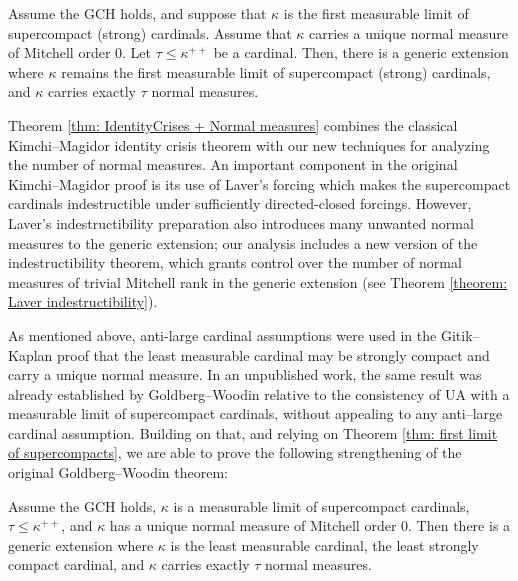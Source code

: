 \documentclass[11pt]{amsart}
\newenvironment{manualtheorem}[1]{%
  \IfBlankTF{#1}
    {\renewcommand{\themanualtheoreminner}{\unskip}}
    {\renewcommand\themanualtheoreminner{#1}}%
  \manualtheoreminner
}{\endmanualtheoreminner}
\theoremstyle{definition}
\theoremstyle{remark}
\newcommand\<{{<}}
\begin{document}
\begin{manualtheorem}{\ref{thm: first limit of supercompacts}}
  Assume the $\mathrm{GCH}$ holds, and  suppose that $\kappa$ is the first measurable limit of supercompact (strong) cardinals. Assume that $\kappa$ carries a unique normal measure of Mitchell order 0. Let $\tau\leq \kappa^{++}$ be a cardinal. Then, there is  a generic extension where $\kappa$ remains the first measurable limit of supercompact (strong) cardinals, and $\kappa$ carries exactly $\tau$ normal measures. 
\end{manualtheorem}




Theorem \ref{thm: IdentityCrises + Normal measures} combines the classical Kimchi--Magidor identity crisis theorem with our new techniques for analyzing the number of normal measures. An important component in the original Kimchi--Magidor proof is its use of Laver's forcing which makes the supercompact cardinals indestructible under sufficiently directed-closed forcings. However, Laver's indestructibility preparation also introduces many unwanted normal measures to the generic extension; our analysis includes a new version of the indestructibility theorem, which grants control over the number of normal measures of trivial Mitchell rank in the generic extension (see Theorem \ref{theorem: Laver indestructibility}). 

As mentioned above, anti-large cardinal assumptions were used in the Gitik--Kaplan proof that the least measurable cardinal may be strongly compact and carry a unique normal measure. In an unpublished work, the same result was already established by Goldberg--Woodin relative to the consistency of UA with a measurable limit of supercompact cardinals, without appealing to any anti--large cardinal assumption. Building on that, and relying on Theorem \ref{thm: first limit of supercompacts}, we are able to prove the following strengthening of the original Goldberg--Woodin theorem:


\begin{manualtheorem}{\ref{thm: Goldberg-Woodin}}
    Assume the $\mathrm{GCH}$ holds, $\kappa$ is a  measurable limit of supercompact cardinals, $\tau\leq \kappa^{++}$, and $\kappa$ has a unique normal measure of Mitchell order 0. Then there is a generic extension where $\kappa$ is the least measurable cardinal, the least strongly compact cardinal, and $\kappa$ carries exactly $\tau$ normal measures.
\end{manualtheorem}
\end{document}
